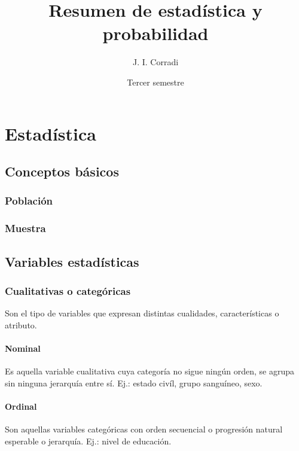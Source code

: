 \documentclass{report}
\title{Resumen de estadística y probabilidad}
\date{Tercer semestre}
\author{J. I. Corradi}
\begin{document}
  \maketitle
  \setcounter{tocdepth}{5}
  \tableofcontents
  \newpage

  \chapter*{Estadística}

    \section*{Conceptos básicos}

      \subsection*{Población}

      \subsection*{Muestra}

    \section*{Variables estadísticas}

      \subsection*{Cualitativas o categóricas}
        Son el tipo de variables que expresan distintas cualidades, características 
        o atributo.

        \subsubsection*{Nominal}
          Es aquella variable cualitativa cuya categoría no sigue ningún orden, 
          se agrupa sin ninguna jerarquía entre sí. Ej.: estado civíl, grupo 
          sanguíneo, sexo.
        \subsubsection*{Ordinal} 
          Son aquellas variables categóricas con orden secuencial o progresión 
          natural esperable o jerarquía. Ej.: nivel de educación.
\end{document}
